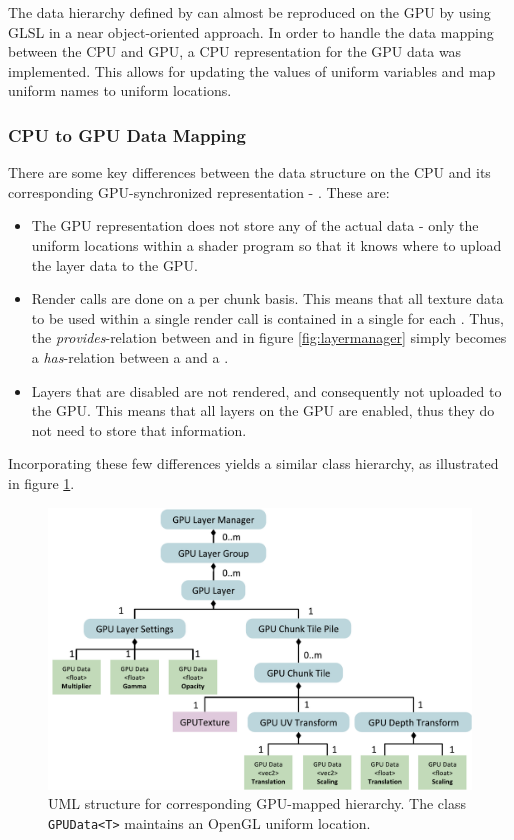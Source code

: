 The data hierarchy defined by  can almost be reproduced on the GPU by using GLSL in a near object-oriented approach. In order to handle the data mapping between the CPU and GPU, a CPU representation for the GPU data was implemented. This allows for updating the values of uniform variables and map uniform names to uniform locations.

\subsubsection{CPU to GPU Data Mapping}

There are some key differences between the  data structure on the CPU and its corresponding GPU-synchronized representation - . These are:

\begin{itemize}
\item The GPU representation does not store any of the actual  data - only the uniform locations within a shader program so that it knows where to upload the layer data to the GPU. 
\item Render calls are done on a per chunk basis. This means that all texture data to be used within a single render call is contained in a single  for each . Thus, the \emph{provides}-relation between  and  in figure \ref{fig:layermanager} simply becomes a \emph{has}-relation between a  and a .
\item Layers that are disabled are not rendered, and consequently not uploaded to the GPU. This means that all layers on the GPU are enabled, thus they do not need to store that information.
\end{itemize}

Incorporating these few differences yields a similar class hierarchy, as illustrated in figure \ref{fig:gpulayermanager}. 

\begin{figure}[htbp]
    \centering
    \includegraphics[width=\textwidth]{figures/implementation/layers/gpulayermanager.pdf}
    \caption{UML structure for corresponding GPU-mapped hierarchy. The class \texttt{GPUData<T>} maintains an OpenGL uniform location.}
    \label{fig:gpulayermanager}
\end{figure}

